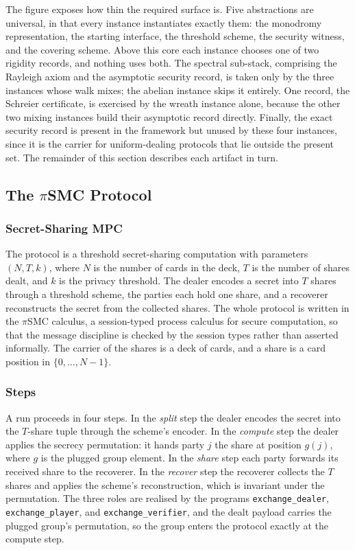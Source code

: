 \documentclass[a4paper,11pt]{article}
\newcommand{\id}[1]{\texttt{\small #1}}
\begin{document}
The figure exposes how thin the required surface is. Five abstractions are
universal, in that every instance instantiates exactly them: the monodromy
representation, the starting interface, the threshold scheme, the security
witness, and the covering scheme. Above this core each instance chooses one of
two rigidity records, and nothing uses both. The spectral sub-stack, comprising
the Rayleigh axiom and the asymptotic security record, is taken only by the
three instances whose walk mixes; the abelian instance skips it entirely. One
record, the Schreier certificate, is exercised by the wreath instance alone,
because the other two mixing instances build their asymptotic record directly.
Finally, the exact security record is present in the framework but unused by
these four instances, since it is the carrier for uniform-dealing protocols that
lie outside the present set. The remainder of this section describes each
artifact in turn.

\subsection{The $\pi$SMC Protocol}

\subsubsection{Secret-Sharing MPC}

The protocol is a threshold secret-sharing computation with parameters
$(N,T,k)$, where $N$ is the number of cards in the deck, $T$ is the number of
shares dealt, and $k$ is the privacy threshold. The dealer encodes a secret into
$T$ shares through a threshold scheme, the parties each hold one share, and a
recoverer reconstructs the secret from the collected shares. The whole protocol
is written in the $\pi$SMC calculus, a session-typed process calculus for
secure computation, so that the message discipline is checked by the session
types rather than asserted informally. The carrier of the shares is a deck of
cards, and a share is a card position in $\{0,\dots,N-1\}$.

\subsubsection{Steps}

A run proceeds in four steps. In the \emph{split} step the dealer encodes the
secret into the $T$-share tuple through the scheme's encoder. In the
\emph{compute} step the dealer applies the secrecy permutation: it hands party
$j$ the share at position $g(j)$, where $g$ is the plugged group element. In the
\emph{share} step each party forwards its received share to the recoverer. In
the \emph{recover} step the recoverer collects the $T$ shares and applies the
scheme's reconstruction, which is invariant under the permutation. The three
roles are realised by the programs \id{exchange\_dealer}, \id{exchange\_player},
and \id{exchange\_verifier}, and the dealt payload carries the plugged group's
permutation, so the group enters the protocol exactly at the compute step.
\end{document}
